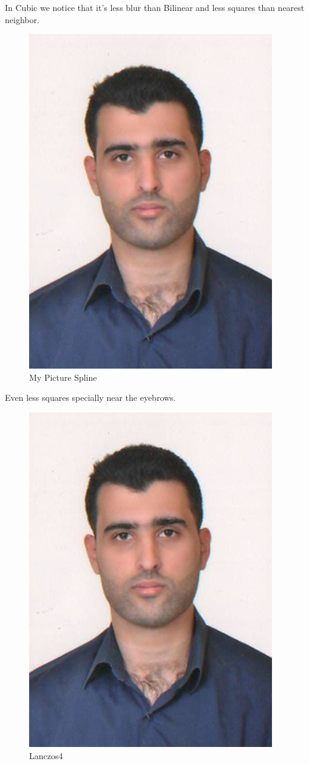 \documentclass{article}
\begin{document}
In Cubic we notice that it's less blur than Bilinear and less squares than nearest neighbor.
\begin{figure}[H]
	\begin{center}
		\includegraphics[scale=1]{mypicturespline.png}
	\end{center}
	\caption{My Picture Spline} 
\end{figure}
Even less squares specially near the eyebrows.
\begin{figure}[H]
\begin{center}
\includegraphics[scale=1]{mypictureLanczos.png}
\end{center}
\caption{Lanczos4 }
\end{figure}
\end{document}
